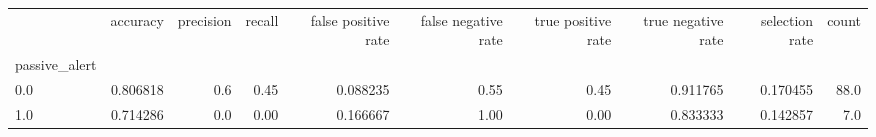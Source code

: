 \begin{tabular}{lrrrrrrrrr}
\toprule
{} &  accuracy &  precision &  recall &  false positive rate &  false negative rate &  true positive rate &  true negative rate &  selection rate &  count \\
passive\_alert &           &            &         &                      &                      &                     &                     &                 &        \\
\midrule
0.0           &  0.806818 &        0.6 &    0.45 &             0.088235 &                 0.55 &                0.45 &            0.911765 &        0.170455 &   88.0 \\
1.0           &  0.714286 &        0.0 &    0.00 &             0.166667 &                 1.00 &                0.00 &            0.833333 &        0.142857 &    7.0 \\
\bottomrule
\end{tabular}
